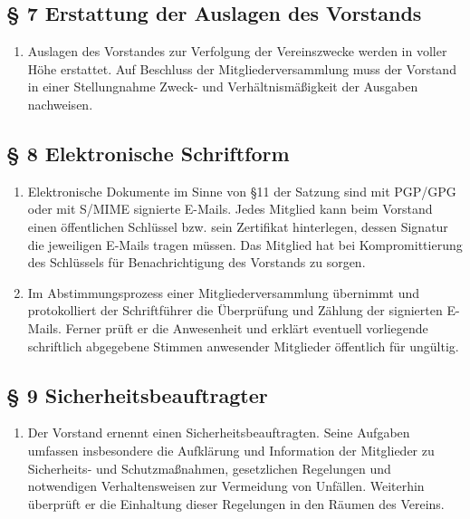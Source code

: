 \documentclass[10pt,a4paper]{article}
\begin{document}
\subsection*{§ 7 Erstattung der Auslagen des Vorstands}
\begin{enumerate}
\item Auslagen des Vorstandes zur Verfolgung der Vereinszwecke werden
	in voller Höhe erstattet. Auf Beschluss der Mitgliederversammlung
	muss der Vorstand in einer Stellungnahme Zweck- und Verhältnis\-mäßigkeit
	der Ausgaben nachweisen.
\end{enumerate}

\subsection*{§ 8 Elektronische Schriftform}
\begin{enumerate}
\item Elektronische Dokumente im Sinne von §11 der Satzung sind mit PGP/GPG
	oder mit S/MIME signierte E-Mails. Jedes Mitglied kann beim Vorstand
	einen öffentlichen Schlüssel bzw. sein Zertifikat hinterlegen, dessen
	Signatur die jeweiligen E-Mails tragen müssen. Das Mitglied hat bei
	Kompromittierung des Schlüssels für Benachrichtigung des Vorstands
	zu sorgen.
\item Im Abstimmungsprozess einer Mitgliederversammlung
	übernimmt und protokolliert der Schriftführer die Überprüfung und
	Zählung der signierten E-Mails. Ferner prüft er die Anwesenheit und
	erklärt eventuell vorliegende schriftlich abgegebene Stimmen anwesender
	Mitglieder öffentlich für ungültig.
\end{enumerate}

\subsection*{§ 9 Sicherheitsbeauftragter}
\begin{enumerate}
\item Der Vorstand ernennt einen Sicherheitsbeauftragten. Seine Aufgaben
	umfassen insbesondere die Aufklärung und Information der Mitglieder
	zu Sicherheits- und Schutzmaßnahmen, gesetzlichen Regelungen und
	notwendigen Verhaltensweisen zur Vermeidung von Unfällen. Weiterhin
	überprüft er die Einhaltung dieser Regelungen in den Räumen des
	Vereins.
\end{enumerate}
\end{document}
